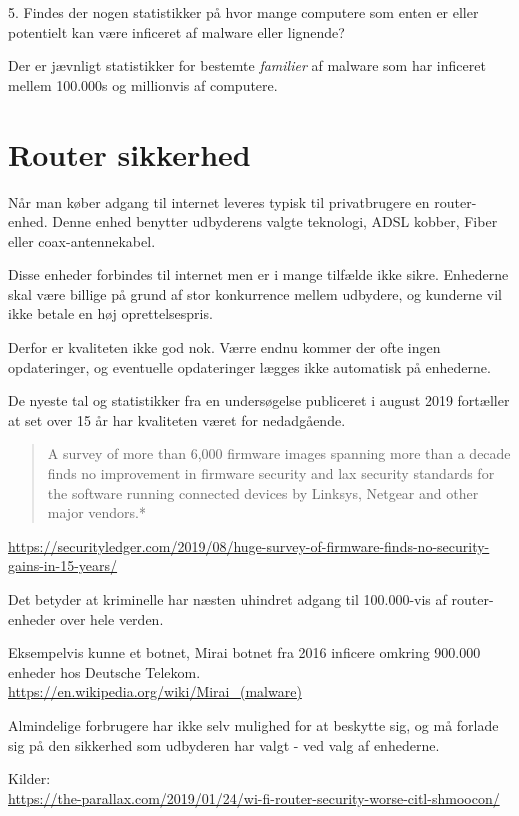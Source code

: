\documentclass[a4paper,11pt,notitlepage]{report}
\begin{document}
5.  Findes der nogen statistikker på hvor mange computere som enten er eller potentielt kan være inficeret af malware eller lignende?

Der er jævnligt statistikker for bestemte \emph{familier} af malware som har inficeret mellem 100.000s og millionvis af computere.


\chapter{Router sikkerhed}
\label{router-security}

Når man køber adgang til internet leveres typisk til privatbrugere en router-enhed. Denne enhed benytter udbyderens valgte teknologi, ADSL kobber, Fiber eller coax-antennekabel.

Disse enheder forbindes til internet men er i mange tilfælde ikke sikre. Enhederne skal være billige på grund af stor konkurrence mellem udbydere, og kunderne vil ikke betale en høj oprettelsespris.

Derfor er kvaliteten ikke god nok. Værre endnu kommer der ofte ingen opdateringer, og eventuelle opdateringer lægges ikke automatisk på enhederne.

De nyeste tal og statistikker fra en undersøgelse publiceret i august 2019 fortæller at set over 15 år har kvaliteten været for nedadgående.

\begin{quote}
  A survey of more than 6,000 firmware images spanning more than a decade finds no improvement in firmware security and lax security standards for the software running connected devices by Linksys, Netgear and other major vendors.*
\end{quote}

{\footnotesize\url{https://securityledger.com/2019/08/huge-survey-of-firmware-finds-no-security-gains-in-15-years/}}

Det betyder at kriminelle har næsten uhindret adgang til 100.000-vis af router-enheder over hele verden.

Eksempelvis kunne et botnet, Mirai botnet fra 2016 inficere omkring 900.000 enheder hos Deutsche Telekom.\\
{\footnotesize\url{https://en.wikipedia.org/wiki/Mirai_(malware)}}

Almindelige forbrugere har ikke selv mulighed for at beskytte sig, og må forlade sig på den sikkerhed som udbyderen har valgt - ved valg af enhederne.

Kilder:\\
{\footnotesize\url{https://the-parallax.com/2019/01/24/wi-fi-router-security-worse-citl-shmoocon/}}
\end{document}
